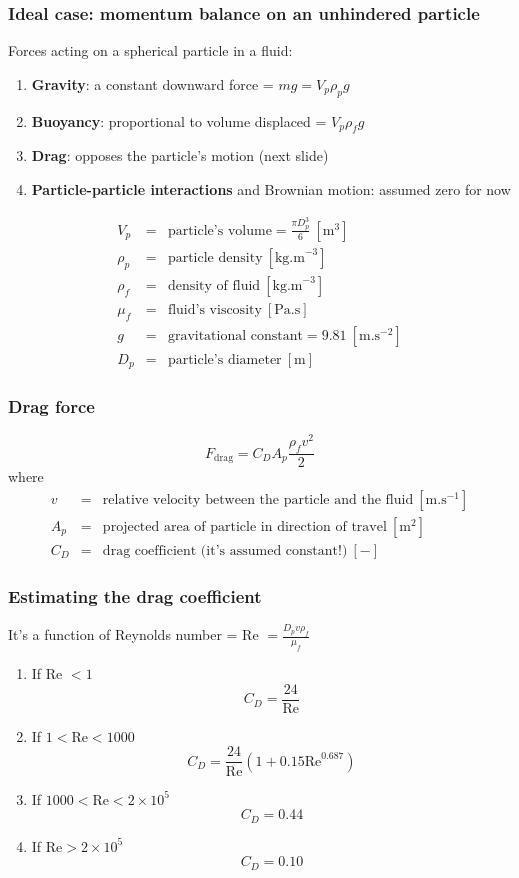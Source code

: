 \begin{frame}\frametitle{Ideal case: momentum balance on an unhindered particle}	
	Forces acting on a spherical particle in a fluid:
	\begin{enumerate}
		\item	\textbf{Gravity}: a constant downward force = $mg = V_p \rho_p g$		
		\item	\textbf{Buoyancy}: proportional to volume displaced = $V_p \rho_f g$
		\item	\textbf{Drag}: opposes the particle's motion (next slide)
		\item	\textbf{Particle-particle interactions} and Brownian motion: assumed zero for now
	\end{enumerate}	
	\[
		\begin{array}{rcl}
			V_p		&=& \text{particle's volume} = \displaystyle \frac{\pi D_p^3}{6} ~[\text{m}^3]\\
			\rho_p 	&=& \text{particle density}~[\text{kg.m}^{-3}]\\
			\rho_f  &=& \text{density of fluid}~[\text{kg.m}^{-3}]\\
			\mu_f   &=& \text{fluid's viscosity}~[\text{Pa.s}]\\
			g		&=& \text{gravitational constant} = 9.81~[\text{m.s}^{-2}] \\
			D_p 	&=& \text{particle's diameter}~[\text{m}]
		\end{array}
	\]
\end{frame}

\begin{frame}\frametitle{Drag force}
	\[
	 	F_\text{drag} = C_D A_p \frac{\rho_f v^2}{2}
	\]
	where
	\[
		\begin{array}{rcl}
			v	&=& \text{relative velocity between the particle and the fluid}~[\text{m.s}^{-1}] \\
			A_p &=& \text{projected area of particle in direction of travel}~[\text{m}^2] \\
			C_D	&=& \text{drag coefficient (it's assumed constant!)}~[-]
		\end{array}
	\]
\end{frame}

\begin{frame}\frametitle{Estimating the drag coefficient}
	It's a function of Reynolds number = Re $= \displaystyle \frac{D_p v \rho_f}{\mu_f}$ \\
	\begin{enumerate}
		\item	If Re $< 1$
				\[
					C_D = \frac{24}{\text{Re}}
				\]
				
		\item	If $1 < \text{Re} < \text{1000}$
				\[
					C_D = \frac{24}{\text{Re}}\left(1 + 0.15 \text{Re}^{0.687} \right)
				\]
		\item	If $\text{1000} < \text{Re} < 2\times10^5 $
				\[
					C_D = 0.44
				\]
		\item	If $\text{Re} > 2\times10^5 $
				\[
					C_D = 0.10
				\]			
	\end{enumerate}	
\end{frame}

